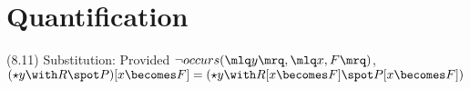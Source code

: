 \documentclass[a4paper,10pt]{article}
\newenvironment{theoremlist}{
\begin{description}
  \setlength{\itemsep}{1.5pt}
  \setlength{\parskip}{0pt}
  \setlength{\parsep}{0pt}
}{\end{description}}
\begin{document}
\section{Quantification}

\begin{theoremlist}
\item[(8.11) Substitution:]							Provided $ \lnot occurs(\mlq y \mrq,\mlq x,F \mrq)$,\newline
										$(\star y \with R \spot P)[x \becomes F] = (\star y \with R[x \becomes F] \spot P[x \becomes F]) $

\end{theoremlist}
\end{document}

